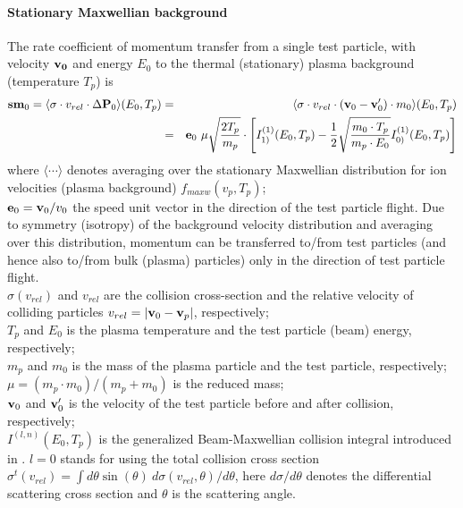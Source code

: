 \documentclass[12pt,dvipdfmx]{article}
\begin{document}
\paragraph{Stationary Maxwellian background}
The rate coefficient of momentum transfer from a single test particle, with velocity ${\bf v_0}$ and energy $E_0$ to the thermal (stationary) plasma background (temperature $T_p$) is
\begin{eqnarray}\label{mom-tally}
{\bf sm}_0=\langle\sigma\cdot v_{rel}\cdot \Delta {\bf P}_0\rangle(E_0,T_p)&=&
\langle\sigma\cdot v_{rel} \cdot \left({\bf v}_0-{\bf v}'_0\right)\cdot m_0\rangle(E_0,T_p)\\\nonumber
&=&
{\bf e}_0 \ \mu\sqrt{\frac{2T_p}{m_p}}\cdot\left[I^{(1)}_{1)}(E_0,T_p)-
          \frac{1}{2}\sqrt{\frac{m_0\cdot T_p}{m_p\cdot E_0}}I^{(1)}_{0)}(E_0,T_p)\right]
\end{eqnarray}
where
$\langle \cdots \rangle$ denotes averaging over the stationary Maxwellian distribution for ion velocities (plasma background) $f_{maxw}(v_p,T_p)$;\\
${\bf e}_0 = {\bf v}_0/v_0$ the speed unit vector in the direction
of the test particle flight. Due to symmetry (isotropy) of the background velocity distribution
and averaging over this distribution, momentum can be transferred to/from test particles (and hence also to/from bulk (plasma) particles) only in
the direction of test particle flight.\\
$\sigma(v_{rel})$ and $v_{rel}$ are the collision cross-section and the relative velocity of colliding particles $v_{rel}=|{\bf v}_0 - {\bf v}_p|$, respectively;\\
$T_p$ and $E_0$ is the plasma temperature and the test particle (beam) energy, respectively;\\
$m_p$ and $m_0$ is the mass of the plasma particle and the test particle, respectively;\\
$\mu=(m_p\cdot m_0)/(m_p+m_0)$ is the reduced mass;\\
${\bf v}_0$ and ${\bf v}'_0$ is the velocity of the test particle before and after collision, respectively;\\
$I^{(l,n)}(E_0,T_p)$ is the generalized Beam-Maxwellian collision integral introduced in \cite{kn:Reiter-Janev}.
$l=0$ stands for using the total collision cross section $\sigma^t(v_{rel}) = \int d\theta \sin(\theta) \ d\sigma(v_{rel},\theta)/d\theta$, here $d\sigma/d\theta$ denotes the differential scattering cross section
and $\theta$ is the scattering angle.
\end{document}
